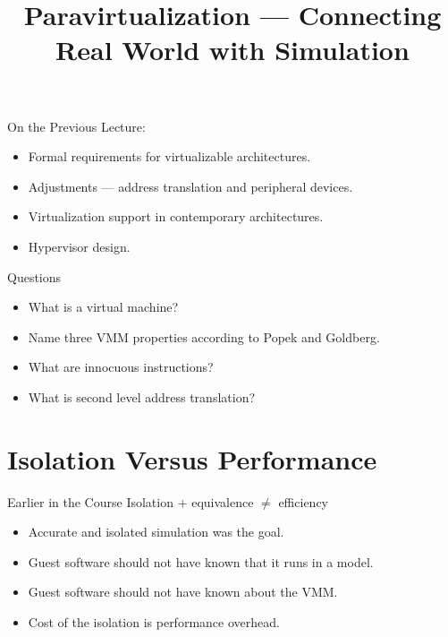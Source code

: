 
\title{Paravirtualization --- Connecting Real World with Simulation}




\startslides

\begin{frame}{On the Previous Lecture:}
  \begin{itemize}
    \item Formal requirements for virtualizable architectures.
    \item Adjustments --- address translation and peripheral devices.
    \item Virtualization support in contemporary architectures.
    \item Hypervisor design.
  \end{itemize}
\end{frame}

\begin{frame}{Questions}
  \begin{itemize}
    \item What is a virtual machine?\pause
    \item Name three VMM properties according to Popek and Goldberg.\pause
    \item What are innocuous instructions?\pause
    \item What is second level address translation?
  \end{itemize}
\end{frame}

\section{Isolation Versus Performance}

\begin{frame}{Earlier in the Course}
  Isolation + equivalence $\neq$ efficiency
  \begin{itemize}
    \item Accurate and isolated simulation was the goal.
    \item Guest software should not have known that it runs in a model.
    \item Guest software should not have known about the VMM.
    \item Cost of the isolation is performance overhead.
  \end{itemize}
\end{frame}

